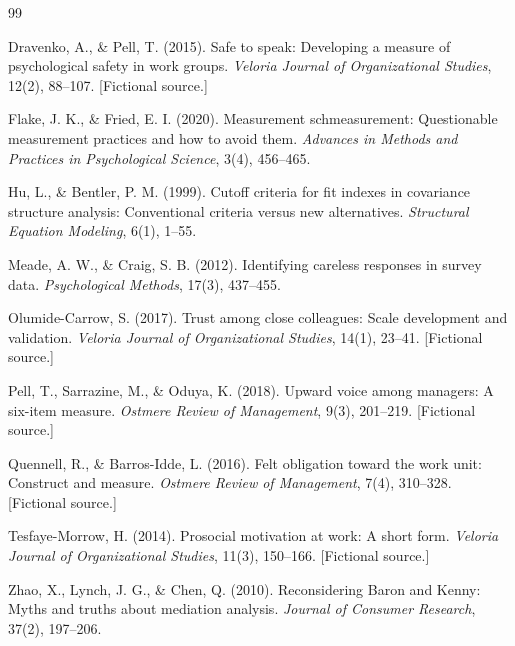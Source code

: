 \documentclass[12pt]{article}
\begin{document}
\begin{thebibliography}{99}
\setlength{\itemsep}{2pt}

Dravenko, A., \& Pell, T. (2015). Safe to speak: Developing a measure of psychological safety in work groups. \textit{Veloria Journal of Organizational Studies}, 12(2), 88--107. [Fictional source.]

Flake, J. K., \& Fried, E. I. (2020). Measurement schmeasurement: Questionable measurement practices and how to avoid them. \textit{Advances in Methods and Practices in Psychological Science}, 3(4), 456--465.

Hu, L., \& Bentler, P. M. (1999). Cutoff criteria for fit indexes in covariance structure analysis: Conventional criteria versus new alternatives. \textit{Structural Equation Modeling}, 6(1), 1--55.

Meade, A. W., \& Craig, S. B. (2012). Identifying careless responses in survey data. \textit{Psychological Methods}, 17(3), 437--455.

Olumide-Carrow, S. (2017). Trust among close colleagues: Scale development and validation. \textit{Veloria Journal of Organizational Studies}, 14(1), 23--41. [Fictional source.]

Pell, T., Sarrazine, M., \& Oduya, K. (2018). Upward voice among managers: A six-item measure. \textit{Ostmere Review of Management}, 9(3), 201--219. [Fictional source.]

Quennell, R., \& Barros-Idde, L. (2016). Felt obligation toward the work unit: Construct and measure. \textit{Ostmere Review of Management}, 7(4), 310--328. [Fictional source.]

Tesfaye-Morrow, H. (2014). Prosocial motivation at work: A short form. \textit{Veloria Journal of Organizational Studies}, 11(3), 150--166. [Fictional source.]

Zhao, X., Lynch, J. G., \& Chen, Q. (2010). Reconsidering Baron and Kenny: Myths and truths about mediation analysis. \textit{Journal of Consumer Research}, 37(2), 197--206.

\end{thebibliography}

\clearpage
\appendix
\end{document}
